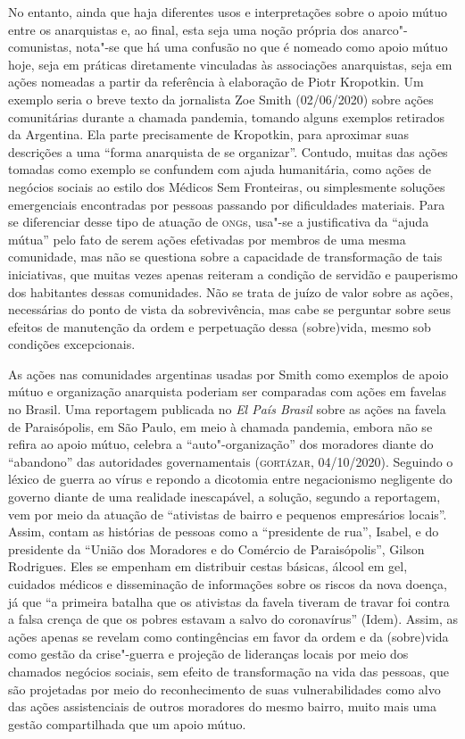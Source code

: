 No entanto, ainda que haja diferentes usos e interpretações sobre o
apoio mútuo entre os anarquistas e, ao final, esta seja uma noção
própria dos anarco"-comunistas, nota"-se que há uma confusão no que é
nomeado como apoio mútuo hoje, seja em práticas diretamente vinculadas
às associações anarquistas, seja em ações nomeadas a partir da
referência à elaboração de Piotr Kropotkin. Um exemplo seria o breve
texto da jornalista Zoe Smith (02/06/2020) sobre ações comunitárias
durante a chamada pandemia, tomando alguns exemplos retirados da
Argentina. Ela parte precisamente de Kropotkin, para aproximar suas
descrições a uma ``forma anarquista de se organizar''. Contudo, muitas
das ações tomadas como exemplo se confundem com ajuda humanitária, como
ações de negócios sociais ao estilo dos Médicos Sem Fronteiras, ou
simplesmente soluções emergenciais encontradas por pessoas passando por
dificuldades materiais. Para se diferenciar desse tipo de atuação de
\textsc{ong}s, usa"-se a justificativa da ``ajuda mútua'' pelo fato de serem ações
efetivadas por membros de uma mesma comunidade, mas não se questiona
sobre a capacidade de transformação de tais iniciativas, que muitas
vezes apenas reiteram a condição de servidão e pauperismo dos habitantes
dessas comunidades. Não se trata de juízo de valor sobre as ações,
necessárias do ponto de vista da sobrevivência, mas cabe se perguntar
sobre seus efeitos de manutenção da ordem e perpetuação dessa
(sobre)vida, mesmo sob condições excepcionais.

As ações nas comunidades argentinas usadas por Smith como exemplos de
apoio mútuo e organização anarquista poderiam ser comparadas com ações
em favelas no Brasil. Uma reportagem publicada no \emph{El País Brasil}
sobre as ações na favela de Paraisópolis, em São Paulo, em meio à
chamada pandemia, embora não se refira ao apoio mútuo, celebra a
``auto"-organização'' dos moradores diante do ``abandono'' das
autoridades governamentais (\textsc{gortázar}, 04/10/2020). Seguindo o léxico de
guerra ao vírus e repondo a dicotomia entre negacionismo negligente do
governo diante de uma realidade inescapável, a solução, segundo a
reportagem, vem por meio da atuação de ``ativistas de bairro e pequenos
empresários locais''. Assim, contam as histórias de pessoas como a
``presidente de rua'', Isabel, e do presidente da ``União dos Moradores
e do Comércio de Paraisópolis'', Gilson Rodrigues. Eles se empenham em
distribuir cestas básicas, álcool em gel, cuidados médicos e
disseminação de informações sobre os riscos da nova doença, já que ``a
primeira batalha que os ativistas da favela tiveram de travar foi contra
a falsa crença de que os pobres estavam a salvo do coronavírus'' (Idem).
Assim, as ações apenas se revelam como contingências em favor da ordem e
da (sobre)vida como gestão da crise"-guerra e projeção de lideranças
locais por meio dos chamados negócios sociais, sem efeito de
transformação na vida das pessoas, que são projetadas por meio do
reconhecimento de suas vulnerabilidades como alvo das ações
assistenciais de outros moradores do mesmo bairro, muito mais uma gestão
compartilhada que um apoio mútuo.

